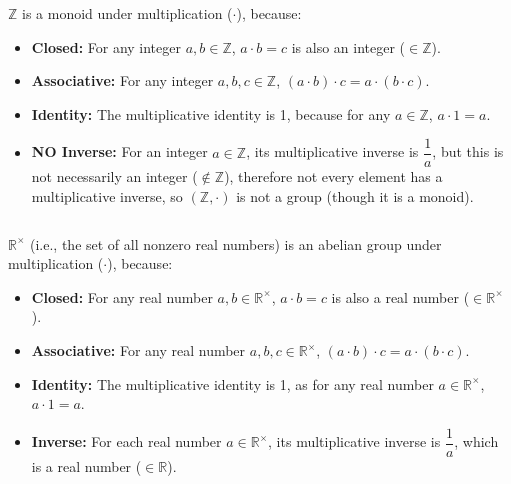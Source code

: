 \noindent $\mathbb{Z}$ is a monoid under multiplication ($\cdot$), because:
\begin{itemize}
\item \textbf{Closed:} For any integer $a, b \in \mathbb{Z}$, $a \cdot b = c$ is also an integer ($\in \mathbb{Z}$).
\item \textbf{Associative:} For any integer $a, b, c \in \mathbb{Z}$, $(a \cdot b) \cdot c = a \cdot (b \cdot c)$.
\item \textbf{Identity:} The multiplicative identity is 1, because for any $a \in \mathbb{Z}$, $a \cdot 1 = a$.
\item \textbf{NO Inverse:} For an integer $a \in \mathbb{Z}$, its multiplicative inverse is $\dfrac{1}{a}$, but this is not necessarily an integer ($\notin \mathbb{Z}$), therefore not every element has a multiplicative inverse, so $(\mathbb{Z},\cdot)$ is not a group (though it is a monoid).
\end{itemize}
$ $

\noindent $\mathbb{R}^\times$ (i.e., the set of all nonzero real numbers) is an abelian group under multiplication ($\cdot$), because:
\begin{itemize}
\item \textbf{Closed:} For any real number $a, b \in \mathbb{R}^\times$, $a \cdot b = c$ is also a real number ($\in \mathbb{R}^\times$).
\item \textbf{Associative:} For any real number $a, b, c \in \mathbb{R}^\times$, $(a \cdot b) \cdot c = a \cdot (b \cdot c)$.
\item \textbf{Identity:} The multiplicative identity is 1, as for any real number $a \in \mathbb{R}^\times$, $a \cdot 1 = a$.
\item \textbf{Inverse:} For each real number $a \in \mathbb{R}^\times$, its multiplicative inverse is $\dfrac{1}{a}$, which is a real number ($\in \mathbb{R}$).
\end{itemize}